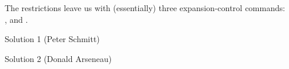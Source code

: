 \begin{comment}
[Solutions for exercises 1,2,3 were originally posted together on 25 Oct 91]
Date: Fri 25 Oct 91 15:19:44-EST
From: Michael Downes <MJD@MATH.AMS.COM>
Subject: `Around the bend' #1 solutions
To: info-tex@shsu.edu

Solutions to the exercises of `Around the bend' #1.

"*** Exercise 1 (hard):
"Given arbitrary \b, \c, \d (macros without arguments), for example
"
"       \def\b{\c\c}         \def\c{*}            \def\d{\b\c}
"
"figure out how to define \a so that its replacement text consists
"of \b fully expanded plus \c not expanded plus \d expanded exactly once.
"I.e., with the above definitions the replacement text of \a
"should be
"
"       **\c\b\c
"
"You may not use \the or \noexpand in your solution. This is Exercise
"20.16 in the TeXbook, except that there's an added restriction: your
"answer must also not use the \halign ... \span method given in the
"answer to 20.16. (Yes, that means you can't use \valign either!)
\end{comment}

The restrictions leave us with (essentially) three expansion-control
commands: \\
 \cmd{\expandafter}, \cmd{\edef} and \cmd{\def}.

\begin{solution}{Solution 1 (Peter Schmitt)}
\begin{lcode}
   \edef\B{\b}
   \def\defA#1{\def\defa##1##2{\def\a{#1##2##1}}}
   \expandafter\defA\expandafter{\B}
   \expandafter\defa\expandafter{\d}{\c}
\end{lcode}
\end{solution}


\begin{solution}{Solution 2 (Donald Arseneau)}
\begin{lcode}
\edef\e{\b}
\expandafter \expandafter \expandafter \def\expandafter \expandafter
\expandafter \a\expandafter \expandafter \expandafter {\expandafter
\e\expandafter \c\d}
\end{lcode}
\end{solution}

